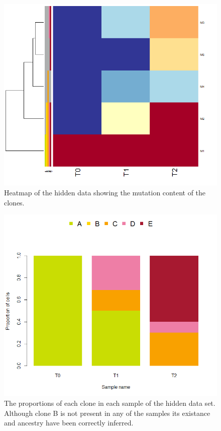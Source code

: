 \documentclass[a4paper]{article}\usepackage[]{graphicx}\usepackage[]{color}
\begin{document}
\begin{figure}[H]
    \centering
    \includegraphics[width=\textwidth]{gaga_hidden_data_heatmap.png}
    \caption{Heatmap of the hidden data showing the mutation content of the clones.}
\end{figure}

\begin{figure}[H]
   \centering
       \includegraphics[width=\textwidth]{gaga_hidden_data_proportions}
   \caption{The proportions of each clone in each sample of the hidden data set.  Although clone B is not present in any of the samples its existance and ancestry have been correctly inferred.}
\end{figure}
\end{document}
